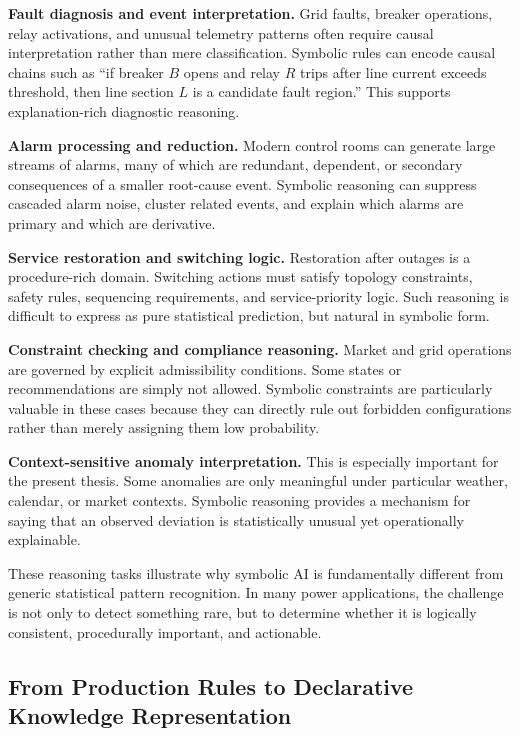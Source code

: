 \textbf{Fault diagnosis and event interpretation.} Grid faults, breaker operations, relay activations, and unusual telemetry patterns often require causal interpretation rather than mere classification. Symbolic rules can encode causal chains such as ``if breaker $B$ opens and relay $R$ trips after line current exceeds threshold, then line section $L$ is a candidate fault region.'' This supports explanation-rich diagnostic reasoning.

\textbf{Alarm processing and reduction.} Modern control rooms can generate large streams of alarms, many of which are redundant, dependent, or secondary consequences of a smaller root-cause event. Symbolic reasoning can suppress cascaded alarm noise, cluster related events, and explain which alarms are primary and which are derivative.

\textbf{Service restoration and switching logic.} Restoration after outages is a procedure-rich domain. Switching actions must satisfy topology constraints, safety rules, sequencing requirements, and service-priority logic. Such reasoning is difficult to express as pure statistical prediction, but natural in symbolic form.

\textbf{Constraint checking and compliance reasoning.} Market and grid operations are governed by explicit admissibility conditions. Some states or recommendations are simply not allowed. Symbolic constraints are particularly valuable in these cases because they can directly rule out forbidden configurations rather than merely assigning them low probability.

\textbf{Context-sensitive anomaly interpretation.} This is especially important for the present thesis. Some anomalies are only meaningful under particular weather, calendar, or market contexts. Symbolic reasoning provides a mechanism for saying that an observed deviation is statistically unusual yet operationally explainable.

These reasoning tasks illustrate why symbolic AI is fundamentally different from generic statistical pattern recognition. In many power applications, the challenge is not only to detect something rare, but to determine whether it is logically consistent, procedurally important, and actionable.

\subsection{From Production Rules to Declarative Knowledge Representation}

